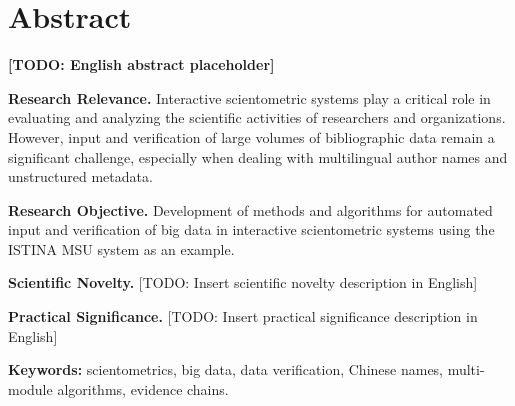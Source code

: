 \documentclass[12pt,a4paper]{report}
\theoremstyle{definition}
\theoremstyle{remark}
\begin{document}
\chapter*{Abstract}

\textbf{[TODO: English abstract placeholder]}

\textbf{Research Relevance.}
Interactive scientometric systems play a critical role in evaluating and analyzing the scientific activities of researchers and organizations. However, input and verification of large volumes of bibliographic data remain a significant challenge, especially when dealing with multilingual author names and unstructured metadata.

\textbf{Research Objective.}
Development of methods and algorithms for automated input and verification of big data in interactive scientometric systems using the ISTINA MSU system as an example.

\textbf{Scientific Novelty.}
[TODO: Insert scientific novelty description in English]

\textbf{Practical Significance.}
[TODO: Insert practical significance description in English]

\textbf{Keywords:}
scientometrics, big data, data verification, Chinese names, multi-module algorithms, evidence chains.

\clearpage


\tableofcontents
\clearpage




\listoftables
\clearpage







\end{document}
